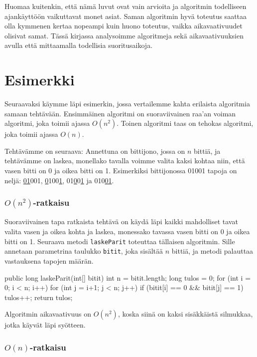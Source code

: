 Huomaa kuitenkin, että nämä luvut ovat vain arvioita ja algoritmin
todelliseen ajankäyttöön vaikuttavat monet asiat.
Saman algoritmin hyvä toteutus saattaa olla
kymmenen kertaa nopeampi kuin huono toteutus,
vaikka aikavaativuudet olisivat samat.
Tässä kirjassa analysoimme algoritmeja sekä aikavaativuuksien
avulla että mittaamalla todellisia suoritusaikoja.

\section{Esimerkki}

Seuraavaksi käymme läpi esimerkin, jossa vertailemme kahta
erilaista algoritmia samaan tehtävään.
Ensimmäinen algoritmi on suoraviivainen raa'an voiman
algoritmi, joka toimii ajassa $O(n^2)$.
Toinen algoritmi taas on tehokas algoritmi,
joka toimii ajassa $O(n)$.

Tehtävämme on seuraava: Annettuna on bittijono, jossa on $n$ bittiä,
ja tehtävämme on laskea, monellako tavalla voimme valita kaksi kohtaa
niin, että vasen bitti on 0 ja oikea bitti on 1.
Esimerkiksi bittijonossa 01001 tapoja on neljä:
\underline{01}001, \underline{0}100\underline{1},
01\underline{0}0\underline{1} ja 010\underline{01}.

\subsubsection{$O(n^2)$-ratkaisu}

Suoraviivainen tapa ratkaista tehtävä on käydä läpi kaikki
mahdolliset tavat valita vasen ja oikea kohta ja laskea,
monessako tavassa vasen bitti on 0 ja oikea bitti on 1.
Seuraava metodi \texttt{laskeParit} toteuttaa tällaisen algoritmin.
Sille annetaan parametrina taulukko \texttt{bitit},
joka sisältää $n$ bittiä, ja metodi palauttaa vastauksena
tapojen määrän.

\begin{code}
public long laskeParit(int[] bitit) {
    int n = bitit.length;
    long tulos = 0;
    for (int i = 0; i < n; i++) {
        for (int j = i+1; j < n; j++) {
            if (bitit[i] == 0 && bitit[j] == 1) tulos++;
        }
    }
    return tulos;
}
\end{code}

Algoritmin aikavaativuus on $O(n^2)$, koska siinä on kaksi
sisäkkäistä silmukkaa, jotka käyvät läpi syötteen.

\subsubsection{$O(n)$-ratkaisu}

